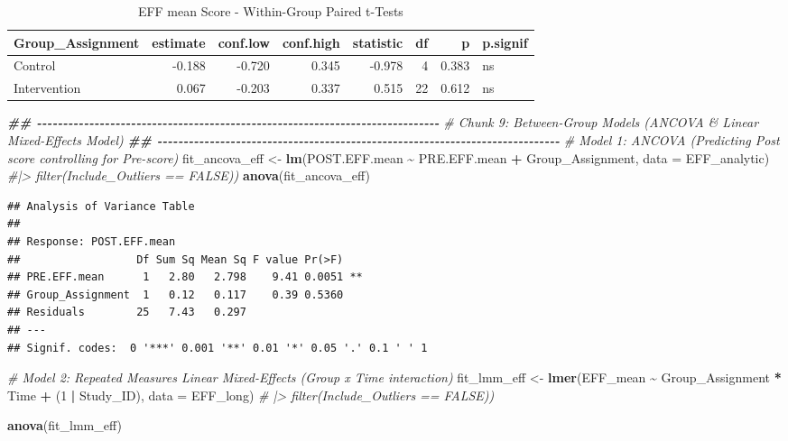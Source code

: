 \documentclass[
]{article}
\newenvironment{Shaded}{\begin{snugshade}}{\end{snugshade}}
\newcommand{\AttributeTok}[1]{\textcolor[rgb]{0.13,0.29,0.53}{#1}}
\newcommand{\CommentTok}[1]{\textcolor[rgb]{0.56,0.35,0.01}{\textit{#1}}}
\newcommand{\DecValTok}[1]{\textcolor[rgb]{0.00,0.00,0.81}{#1}}
\newcommand{\DocumentationTok}[1]{\textcolor[rgb]{0.56,0.35,0.01}{\textbf{\textit{#1}}}}
\newcommand{\FunctionTok}[1]{\textcolor[rgb]{0.13,0.29,0.53}{\textbf{#1}}}
\newcommand{\NormalTok}[1]{#1}
\newcommand{\OtherTok}[1]{\textcolor[rgb]{0.56,0.35,0.01}{#1}}
\newcommand{\SpecialCharTok}[1]{\textcolor[rgb]{0.81,0.36,0.00}{\textbf{#1}}}
\begin{document}
\begin{longtable}[t]{lrrrrrrl}
\caption{\label{tab:unnamed-chunk-12}EFF mean Score - Within-Group Paired t-Tests}\\
\toprule
Group\_Assignment & estimate & conf.low & conf.high & statistic & df & p & p.signif\\
\midrule
Control & -0.188 & -0.720 & 0.345 & -0.978 & 4 & 0.383 & ns\\
Intervention & 0.067 & -0.203 & 0.337 & 0.515 & 22 & 0.612 & ns\\
\bottomrule
\end{longtable}

\begin{Shaded}
\begin{Highlighting}[]
\DocumentationTok{\#\# {-}{-}{-}{-}{-}{-}{-}{-}{-}{-}{-}{-}{-}{-}{-}{-}{-}{-}{-}{-}{-}{-}{-}{-}{-}{-}{-}{-}{-}{-}{-}{-}{-}{-}{-}{-}{-}{-}{-}{-}{-}{-}{-}{-}{-}{-}{-}{-}{-}{-}{-}{-}{-}{-}{-}{-}{-}{-}{-}{-}{-}{-}{-}{-}{-}{-}{-}{-}{-}{-}{-}{-}{-}{-}{-}{-}{-}}
\CommentTok{\# Chunk 9: Between{-}Group Models (ANCOVA \& Linear Mixed{-}Effects Model)}
\DocumentationTok{\#\# {-}{-}{-}{-}{-}{-}{-}{-}{-}{-}{-}{-}{-}{-}{-}{-}{-}{-}{-}{-}{-}{-}{-}{-}{-}{-}{-}{-}{-}{-}{-}{-}{-}{-}{-}{-}{-}{-}{-}{-}{-}{-}{-}{-}{-}{-}{-}{-}{-}{-}{-}{-}{-}{-}{-}{-}{-}{-}{-}{-}{-}{-}{-}{-}{-}{-}{-}{-}{-}{-}{-}{-}{-}{-}{-}{-}{-}}
\CommentTok{\# Model 1: ANCOVA (Predicting Post score controlling for Pre{-}score)}
\NormalTok{fit\_ancova\_eff }\OtherTok{\textless{}{-}} \FunctionTok{lm}\NormalTok{(POST.EFF.mean }\SpecialCharTok{\textasciitilde{}}\NormalTok{ PRE.EFF.mean }\SpecialCharTok{+}\NormalTok{ Group\_Assignment, }
                     \AttributeTok{data =}\NormalTok{ EFF\_analytic) }\CommentTok{\#|\textgreater{} filter(Include\_Outliers == FALSE))}
\FunctionTok{anova}\NormalTok{(fit\_ancova\_eff)}
\end{Highlighting}
\end{Shaded}

\begin{verbatim}
## Analysis of Variance Table
## 
## Response: POST.EFF.mean
##                  Df Sum Sq Mean Sq F value Pr(>F)   
## PRE.EFF.mean      1   2.80   2.798    9.41 0.0051 **
## Group_Assignment  1   0.12   0.117    0.39 0.5360   
## Residuals        25   7.43   0.297                  
## ---
## Signif. codes:  0 '***' 0.001 '**' 0.01 '*' 0.05 '.' 0.1 ' ' 1
\end{verbatim}

\begin{Shaded}
\begin{Highlighting}[]
\CommentTok{\# Model 2: Repeated Measures Linear Mixed{-}Effects (Group x Time interaction)}
\NormalTok{fit\_lmm\_eff }\OtherTok{\textless{}{-}} \FunctionTok{lmer}\NormalTok{(EFF\_mean }\SpecialCharTok{\textasciitilde{}}\NormalTok{ Group\_Assignment }\SpecialCharTok{*}\NormalTok{ Time }\SpecialCharTok{+}\NormalTok{ (}\DecValTok{1} \SpecialCharTok{|}\NormalTok{ Study\_ID), }
                    \AttributeTok{data =}\NormalTok{ EFF\_long) }\CommentTok{\# |\textgreater{} filter(Include\_Outliers == FALSE))}

\FunctionTok{anova}\NormalTok{(fit\_lmm\_eff)}
\end{Highlighting}
\end{Shaded}
\end{document}
